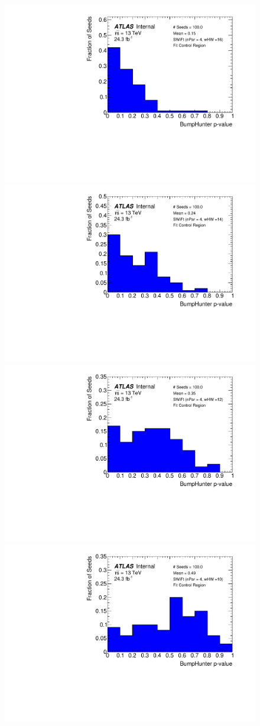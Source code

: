 \begin{figure}[!htb]
\captionsetup[subfigure]{aboveskip=0pt,justification=centering}
\centering
{} {
  \includegraphics[width=0.48\linewidth, angle=0]{figs/Dibjet/LowMass/FitStudy_min566/pVal_bumpHunter_corrFitCR_4para_low16_high16.pdf}
}\hspace{-3mm}                                       
 {                                                    
  \includegraphics[width=0.48\linewidth, angle=0]{figs/Dibjet/LowMass/FitStudy_min566/pVal_bumpHunter_corrFitCR_4para_low14_high14.pdf}
}\hspace{-3mm}                                       
 {                                                    
  \includegraphics[width=0.48\linewidth, angle=0]{figs/Dibjet/LowMass/FitStudy_min566/pVal_bumpHunter_corrFitCR_4para_low12_high12.pdf}
}\hspace{-3mm}                                       
 {                                                    
  \includegraphics[width=0.48\linewidth, angle=0]{figs/Dibjet/LowMass/FitStudy_min566/pVal_bumpHunter_corrFitCR_4para_low10_high10.pdf}
}
\end{figure}

